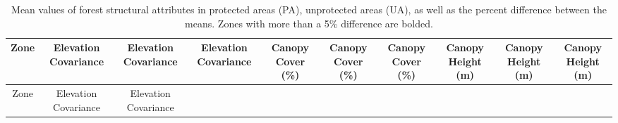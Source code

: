 \documentclass[11pt]{article}
\begin{document}
\hypertarget{tbl:vectab}{}
\begin{longtable}[]{@{}cccccccccc@{}}
\caption{\label{tbl:vectab}Mean values of forest structural attributes
in protected areas (PA), unprotected areas (UA), as well as the percent
difference between the means. Zones with more than a 5\% difference are
bolded.}\tabularnewline
\toprule
\begin{minipage}[b]{0.04\columnwidth}\centering
Zone\strut
\end{minipage} & \begin{minipage}[b]{0.08\columnwidth}\centering
Elevation Covariance\strut
\end{minipage} & \begin{minipage}[b]{0.08\columnwidth}\centering
Elevation Covariance\strut
\end{minipage} & \begin{minipage}[b]{0.08\columnwidth}\centering
Elevation Covariance\strut
\end{minipage} & \begin{minipage}[b]{0.07\columnwidth}\centering
Canopy Cover (\%)\strut
\end{minipage} & \begin{minipage}[b]{0.07\columnwidth}\centering
Canopy Cover (\%)\strut
\end{minipage} & \begin{minipage}[b]{0.07\columnwidth}\centering
Canopy Cover (\%)\strut
\end{minipage} & \begin{minipage}[b]{0.08\columnwidth}\centering
Canopy Height (m)\strut
\end{minipage} & \begin{minipage}[b]{0.08\columnwidth}\centering
Canopy Height (m)\strut
\end{minipage} & \begin{minipage}[b]{0.08\columnwidth}\centering
Canopy Height (m)\strut
\end{minipage}\tabularnewline
\midrule
\endfirsthead
\toprule
\begin{minipage}[b]{0.04\columnwidth}\centering
Zone\strut
\end{minipage} & \begin{minipage}[b]{0.08\columnwidth}\centering
Elevation Covariance\strut
\end{minipage} & \begin{minipage}[b]{0.08\columnwidth}\centering
Elevation Covariance\strut
\end{minipage} & \begin{minipage}[b]{0.08\columnwidth}\centering

\end{minipage}
\end{longtable}
\end{document}
